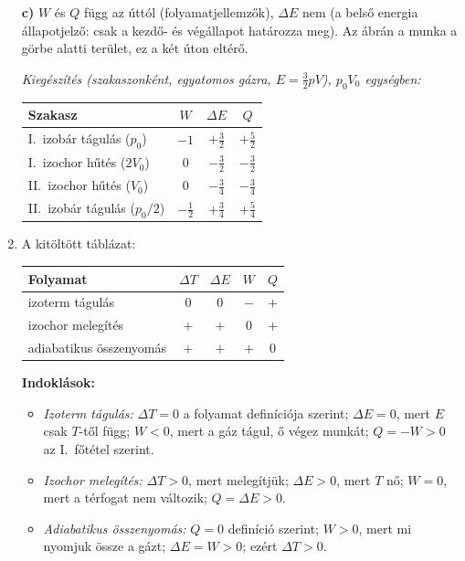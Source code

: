 \documentclass[11pt,a4paper]{article}
\begin{document}
\begin{enumerate}[leftmargin=*,label=\textbf{\arabic*.},itemsep=9pt,topsep=0pt,parsep=0pt]
\textbf{c)} $W$ és $Q$ függ az úttól (folyamatjellemzők), $\Delta E$ nem
(a belső energia állapotjelző: csak a kezdő- és végállapot határozza meg). Az ábrán a
munka a görbe alatti terület, ez a két úton eltérő.

\emph{Kiegészítés (szakaszonként, egyatomos gázra, $E = \tfrac32 pV$), $p_0V_0$
egységben:}
\begin{center}
\renewcommand{\arraystretch}{1.3}
\begin{tabular}{|l|c|c|c|}
\hline
Szakasz & $W$ & $\Delta E$ & $Q$ \\ \hline
I.\ izobár tágulás ($p_0$)          & $-1$ & $+\tfrac32$ & $+\tfrac52$ \\
I.\ izochor hűtés ($2V_0$)           & $0$ & $-\tfrac32$ & $-\tfrac32$ \\ \hline
II.\ izochor hűtés ($V_0$)           & $0$ & $-\tfrac34$ & $-\tfrac34$ \\
II.\ izobár tágulás ($p_0/2$)       & $-\tfrac12$ & $+\tfrac34$ & $+\tfrac54$ \\ \hline
\end{tabular}
\end{center}

\item A kitöltött táblázat:
\begin{center}
\renewcommand{\arraystretch}{1.5}
\begin{tabular}{|l|c|c|c|c|}
\hline
\textbf{Folyamat} & \hspace{0.5cm}$\Delta T$\hspace{0.5cm} & \hspace{0.5cm}$\Delta E$\hspace{0.5cm}
  & \hspace{0.5cm}$W$\hspace{0.5cm} & \hspace{0.5cm}$Q$\hspace{0.5cm} \\ \hline
izoterm tágulás         & $0$ & $0$ & $-$ & $+$ \\ \hline
izochor melegítés       & $+$ & $+$ & $0$ & $+$ \\ \hline
adiabatikus összenyomás & $+$ & $+$ & $+$ & $0$ \\ \hline
\end{tabular}
\end{center}
\textbf{Indoklások:}
\begin{itemize}[nosep,leftmargin=1.5em]
  \item \emph{Izoterm tágulás:} $\Delta T = 0$ a folyamat definíciója szerint;
    $\Delta E = 0$, mert $E$ csak $T$-től függ; $W < 0$, mert a gáz tágul, ő végez
    munkát; $Q = -W > 0$ az I.~főtétel szerint.
  \item \emph{Izochor melegítés:} $\Delta T > 0$, mert melegítjük; $\Delta E > 0$, mert
    $T$ nő; $W = 0$, mert a térfogat nem változik; $Q = \Delta E > 0$.
  \item \emph{Adiabatikus összenyomás:} $Q = 0$ definíció szerint; $W > 0$, mert mi
    nyomjuk össze a gázt; $\Delta E = W > 0$; ezért $\Delta T > 0$.
\end{itemize}


\end{enumerate}
\end{document}
